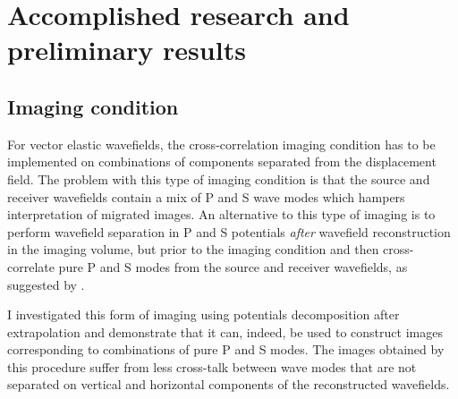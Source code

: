 %
\section{Accomplished research and preliminary results}

\subsection{Imaging condition}



For vector elastic wavefields, the cross-correlation imaging condition has to be implemented on combinations of components separated from the displacement field. The problem with this type of imaging condition is that the source and receiver wavefields contain a mix of P and S wave modes which hampers interpretation of migrated images. An alternative to this type of imaging is to perform wavefield separation in P and S potentials \emph{after} wavefield reconstruction in the imaging volume, but prior to the imaging condition and then cross-correlate pure P and S modes from the source and receiver wavefields, as suggested by \cite{GEO55-07-09140919}.

I investigated this form of imaging using potentials decomposition after extrapolation and demonstrate that it can, indeed, be used to construct images corresponding to combinations of pure P and S modes. The images obtained by this procedure suffer from less  cross-talk between wave modes that are not separated on vertical and horizontal components of the reconstructed wavefields.
